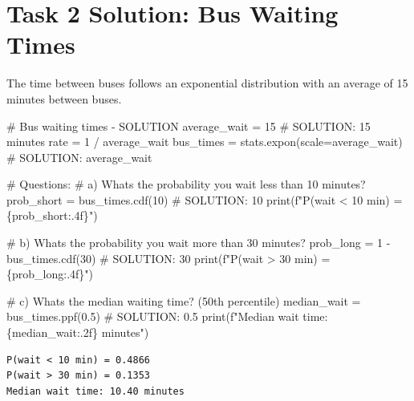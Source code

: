 \documentclass[
  letterpaper,
  DIV=11,
  numbers=noendperiod]{scrartcl}
\newenvironment{Shaded}{\begin{snugshade}}{\end{snugshade}}
\newcommand{\BuiltInTok}[1]{\textcolor[rgb]{0.00,0.23,0.31}{#1}}
\newcommand{\CommentTok}[1]{\textcolor[rgb]{0.37,0.37,0.37}{#1}}
\newcommand{\DecValTok}[1]{\textcolor[rgb]{0.68,0.00,0.00}{#1}}
\newcommand{\FloatTok}[1]{\textcolor[rgb]{0.68,0.00,0.00}{#1}}
\newcommand{\NormalTok}[1]{\textcolor[rgb]{0.00,0.23,0.31}{#1}}
\newcommand{\OperatorTok}[1]{\textcolor[rgb]{0.37,0.37,0.37}{#1}}
\newcommand{\SpecialCharTok}[1]{\textcolor[rgb]{0.37,0.37,0.37}{#1}}
\newcommand{\SpecialStringTok}[1]{\textcolor[rgb]{0.13,0.47,0.30}{#1}}
\begin{document}
\section{Task 2 Solution: Bus Waiting
Times}\label{task-2-solution-bus-waiting-times}

The time between buses follows an exponential distribution with an
average of 15 minutes between buses.

\begin{Shaded}
\begin{Highlighting}[]
\CommentTok{\# Bus waiting times {-} SOLUTION}
\NormalTok{average\_wait }\OperatorTok{=} \DecValTok{15}  \CommentTok{\# SOLUTION: 15 minutes}
\NormalTok{rate }\OperatorTok{=} \DecValTok{1} \OperatorTok{/}\NormalTok{ average\_wait}
\NormalTok{bus\_times }\OperatorTok{=}\NormalTok{ stats.expon(scale}\OperatorTok{=}\NormalTok{average\_wait)  }\CommentTok{\# SOLUTION: average\_wait}

\CommentTok{\# Questions:}
\CommentTok{\# a) What\textquotesingle{}s the probability you wait less than 10 minutes?}
\NormalTok{prob\_short }\OperatorTok{=}\NormalTok{ bus\_times.cdf(}\DecValTok{10}\NormalTok{)  }\CommentTok{\# SOLUTION: 10}
\BuiltInTok{print}\NormalTok{(}\SpecialStringTok{f"P(wait \textless{} 10 min) = }\SpecialCharTok{\{}\NormalTok{prob\_short}\SpecialCharTok{:.4f\}}\SpecialStringTok{"}\NormalTok{)}

\CommentTok{\# b) What\textquotesingle{}s the probability you wait more than 30 minutes?}
\NormalTok{prob\_long }\OperatorTok{=} \DecValTok{1} \OperatorTok{{-}}\NormalTok{ bus\_times.cdf(}\DecValTok{30}\NormalTok{)  }\CommentTok{\# SOLUTION: 30}
\BuiltInTok{print}\NormalTok{(}\SpecialStringTok{f"P(wait \textgreater{} 30 min) = }\SpecialCharTok{\{}\NormalTok{prob\_long}\SpecialCharTok{:.4f\}}\SpecialStringTok{"}\NormalTok{)}

\CommentTok{\# c) What\textquotesingle{}s the median waiting time? (50th percentile)}
\NormalTok{median\_wait }\OperatorTok{=}\NormalTok{ bus\_times.ppf(}\FloatTok{0.5}\NormalTok{)  }\CommentTok{\# SOLUTION: 0.5}
\BuiltInTok{print}\NormalTok{(}\SpecialStringTok{f"Median wait time: }\SpecialCharTok{\{}\NormalTok{median\_wait}\SpecialCharTok{:.2f\}}\SpecialStringTok{ minutes"}\NormalTok{)}
\end{Highlighting}
\end{Shaded}

\begin{verbatim}
P(wait < 10 min) = 0.4866
P(wait > 30 min) = 0.1353
Median wait time: 10.40 minutes
\end{verbatim}
\end{document}
